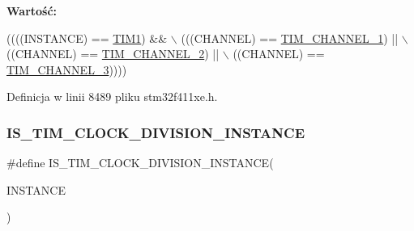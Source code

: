 {\bfseries Wartość\+:}
\begin{DoxyCode}
((((INSTANCE) == \hyperlink{group___peripheral__declaration_ga2e87451fea8dc9380056d3cfc5ed81fb}{TIM1}) &&                    \(\backslash\)
     (((CHANNEL) == \hyperlink{group___t_i_m___channel_ga6b1541e4a49d62610899e24bf23f4879}{TIM\_CHANNEL\_1}) ||           \(\backslash\)
      ((CHANNEL) == \hyperlink{group___t_i_m___channel_ga33e02d43345a7ac5886f01b39e4f7ccd}{TIM\_CHANNEL\_2}) ||           \(\backslash\)
      ((CHANNEL) == \hyperlink{group___t_i_m___channel_ga4ea100c1789b178f3cb46721b7257e2d}{TIM\_CHANNEL\_3}))))
\end{DoxyCode}


Definicja w linii 8489 pliku stm32f411xe.\+h.

\mbox{\label{group___exported__macros_gac54b9f42e8ab07c41abe7d96d13d698a}} 
\subsubsection{\texorpdfstring{I\+S\+\_\+\+T\+I\+M\+\_\+\+C\+L\+O\+C\+K\+\_\+\+D\+I\+V\+I\+S\+I\+O\+N\+\_\+\+I\+N\+S\+T\+A\+N\+CE}{IS\_TIM\_CLOCK\_DIVISION\_INSTANCE}}
{\footnotesize\ttfamily \#define I\+S\+\_\+\+T\+I\+M\+\_\+\+C\+L\+O\+C\+K\+\_\+\+D\+I\+V\+I\+S\+I\+O\+N\+\_\+\+I\+N\+S\+T\+A\+N\+CE(\begin{DoxyParamCaption}\item[{}]{I\+N\+S\+T\+A\+N\+CE }\end{DoxyParamCaption})}


